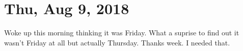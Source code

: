 \section{Thu, Aug 9, 2018}

Woke up this morning thinking it was Friday. What a suprise to find out it wasn't
Friday at all but actually Thursday. Thanks week. I needed that.